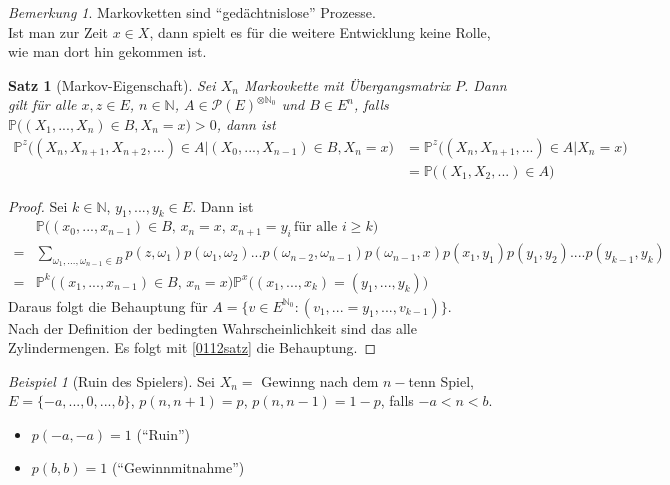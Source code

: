 \documentclass[10pt,a4paper]{article}
\newcommand{\N}{\ensuremath{\mathbb{N}}}
\newcommand{\potset}{\mathscr P}
\newcommand{\Prb}{\mathbb P}
\theoremstyle{plain}
\newtheorem{satz}[theorem]{Satz}
\theoremstyle{definition}
\theoremstyle{remark}
\newtheorem*{bem*}{Bemerkung}
\newtheorem{exm}[theorem]{Beispiel}
\begin{document}
	\begin{bem*}
		Markovketten sind \enquote{gedächtnislose} Prozesse.\\
		Ist man zur Zeit $x\in X$, dann spielt es für die weitere Entwicklung keine Rolle, wie man dort hin gekommen ist.
	\end{bem*}

	\begin{satz}[Markov-Eigenschaft]\label{0708satzMarkov}
		Sei $X_n$ Markovkette mit Übergangsmatrix $P$. Dann gilt für alle $x,z\in E$, $n\in\N$, $A\in\potset(E)^{\otimes\N_0}$ und $B\in E^n$, falls $\Prb\big((X_1,...,X_n)\in B,X_n=x\big)>0$, dann ist
		\begin{align*}
		\Prb^z\big((X_n,X_{n+1},X_{n+2},...)\in A\vert (X_0,...,X_{n-1})\in B,X_n=x\big)&=\Prb^z\big((X_n,X_{n+1},...)\in A\vert X_n=x\big)\\
		&=\Prb\big((X_1,X_2,...)\in A\big)
		\end{align*}
	\end{satz}
	\begin{proof}
		Sei $k\in\N$, $y_1,...,y_k\in E$. Dann ist \begin{align*}
		&\Prb\big((x_0,...,x_{n-1})\in B,\,x_n=x,\, x_{n+1}=y_i\, \text{für alle $i\geq k$}\big)\\
		=&\sum_{\omega_1,...,\omega_{n-1}\in B}p(z,\omega_1)p(\omega_1,\omega_2)...p(\omega_{n-2},\omega_{n-1})p(\omega_{n-1},x)p(x_1,y_1)p(y_1,y_2)....p(y_{k-1},y_k)\\
		=&\Prb^k\big((x_1,...,x_{n-1})\in B,\,x_n=x\big)\Prb^x\big((x_1,...,x_k)=(y_1,...,y_k)\big)
		\end{align*}
		Daraus folgt die Behauptung für $A=\{v\in E^{\N_0}:(v_1,...=y_1,...,v_{k-1})\}$.\\
		Nach der Definition der bedingten Wahrscheinlichkeit sind das alle Zylindermengen. Es folgt mit \ref{0112satz} die Behauptung.
	\end{proof}

	\begin{exm}[Ruin des Spielers]
		Sei $X_n=$ Gewinng nach dem $n-$tenn Spiel, $E=\{-a,...,0,...,b\}$, $p(n,n+1)=p$, $p(n,n-1)=1-p$, falls $-a<n<b$.
		\begin{itemize}
		\item $p(-a,-a)=1$ (\enquote{Ruin})
		\item $p(b,b)=1$ (\enquote{Gewinnmitnahme})
		\end{itemize}
	\end{exm}
\end{document}
